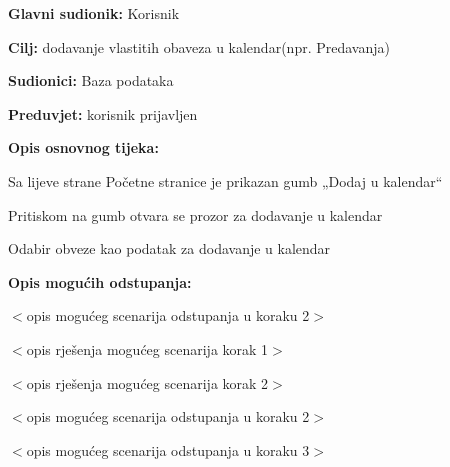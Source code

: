 					\noindent {}
					\begin{packed_item}
	
						\item \textbf{Glavni sudionik: }Korisnik
						\item  \textbf{Cilj:} dodavanje vlastitih obaveza u kalendar(npr. Predavanja)
						\item  \textbf{Sudionici:}
						Baza podataka
						\item  \textbf{Preduvjet:} korisnik prijavljen
						\item  \textbf{Opis osnovnog tijeka:}
						
						\item[] \begin{packed_enum}
	
							\item 	Sa lijeve strane Početne stranice je prikazan gumb „Dodaj u kalendar“
							\item	Pritiskom na gumb otvara  se prozor za dodavanje u kalendar
							\item	Odabir obveze kao podatak za dodavanje u kalendar
							
							
						\end{packed_enum}
						
						\item  \textbf{Opis mogućih odstupanja:}
						
						\item[] \begin{packed_item}
	
							\item[2.a] $<$opis mogućeg scenarija odstupanja u koraku 2$>$
							\item[] \begin{packed_enum}
								
								\item $<$opis rješenja mogućeg scenarija korak 1$>$
								\item $<$opis rješenja mogućeg scenarija korak 2$>$
								
							\end{packed_enum}
							\item[2.b] $<$opis mogućeg scenarija odstupanja u koraku 2$>$
							\item[3.a] $<$opis mogućeg scenarija odstupanja  u koraku 3$>$
							
						\end{packed_item}
					\end{packed_item}
				
